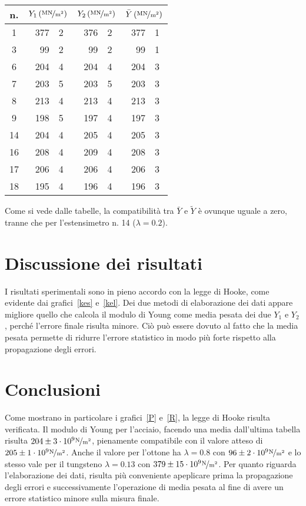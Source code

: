 \documentclass[italian,a4paper]{article}
\begin{document}
\begin{enumerate}
\begin{table}[h]
\centering
 \begin{tabular}{c *3{r@{$\pm$}l}}
  n. &
\multicolumn{2}{c}{$Y_1\,(\unitfrac{MN}{m^2})$}&
\multicolumn{2}{c}{$Y_2\,(\unitfrac{MN}{m^2})$}&
\multicolumn{2}{c}{$\bar{Y}\,(\unitfrac{MN}{m^2})$}\\\hline
1  &377&2 &376&2 &377&1\\
3  &99&2 &99&2 & 99&1\\
6  &204&4 &204&4 &204&3\\
7  &203&5 &203&5 &203&3\\
8  &213&4 &213&4 &213&3\\
9  &198&5 &197&4 &197&3\\
14 &204&4 &205&4 &205&3\\
16 &208&4 &209&4 &208&3\\
17 &206&4 &206&4 &206&3\\
18 &195&4 &196&4 &196&3\\
 \end{tabular}
\end{table}
\end{enumerate}
Come si vede dalle tabelle, la compatibilità tra $\bar{Y}$ e $\widetilde{Y}$ è ovunque uguale a zero, tranne che per l'estensimetro n. 14 ($\lambda = 0.2$).
\section{Discussione dei risultati}
I risultati sperimentali sono in pieno accordo con la legge di Hooke, come evidente dai grafici~\ref{kes} e~\ref{kel}. Dei due metodi di elaborazione dei dati appare migliore quello che calcola il modulo di Young come media pesata dei due $Y_1$ e $Y_2$, perché l'errore finale risulta minore. Ciò può essere dovuto al fatto che la media pesata permette di ridurre l'errore statistico in modo più forte rispetto alla propagazione degli errori.

\section{Conclusioni}
Come mostrano in particolare i grafici~\ref{P} e~\ref{R}, la legge di Hooke risulta verificata. Il modulo di Young per l'acciaio, facendo una media dall'ultima tabella risulta $204\pm3 \cdot 10^9 \unitfrac{N}{m^2}$, pienamente compatibile con il valore atteso di $205\pm1 \cdot 10^9 \unitfrac{N}{m^2}$. Anche il valore per l'ottone ha $\lambda = 0.8$ con $96\pm2\cdot 10^9 \unitfrac{N}{m^2}$ e lo stesso vale per il tungsteno $\lambda = 0.13$ con $379\pm15\cdot 10^9 \unitfrac{N}{m^2}$. Per quanto riguarda l'elaborazione dei dati, risulta più conveniente apeplicare prima la propagazione degli errori e successivamente l'operazione di media pesata al fine di avere un errore statistico minore sulla misura finale.
\newpage
\end{document}
